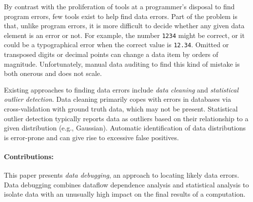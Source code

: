 


By contrast with the proliferation of tools at a programmer's disposal
to find program errors, few tools exist to help find data errors. Part
of the problem is that, unlike program errors, it is more difficult to
decide whether any given data element is an error or not. For example,
the number \texttt{1234} might be correct, or it could be a
typographical error when the correct value is \texttt{12.34}. Omitted
or transposed digits or decimal points can change a data item by
orders of magnitude. Unfortunately, manual data auditing to find this
kind of mistake is both onerous and does not scale.



Existing approaches to finding data errors include
\emph{data cleaning} and  \emph{statistical outlier detection}.
Data cleaning primarily copes with errors in databases via
cross-validation with ground truth data, which may not be
present. Statistical outlier detection typically reports data as
outliers based on their relationship to a given distribution (e.g.,
Gaussian).  Automatic identification of data distributions is
error-prone and can give rise to excessive false positives.



\paragraph{Contributions:}
This paper presents \emph{data debugging}, an approach to locating
likely data errors.  Data debugging combines dataflow dependence
analysis and statistical analysis to isolate data with an
unusually high impact on the final results of a computation.


